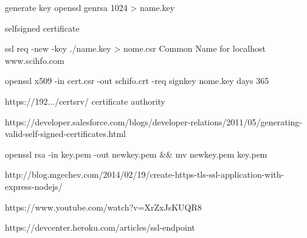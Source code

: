generate key
openssl genrsa 1024 > name.key

selfsigned certificate

ssl req -new -key ./name.key > nome.csr
Common Name for localhost www.scihfo.com

openssl x509 -in cert.csr -out schifo.crt -req signkey nome.key days 365

https://192.../certsrv/
certificate authority

https://developer.salesforce.com/blogs/developer-relations/2011/05/generating-valid-self-signed-certificates.html

openssl rsa -in key.pem -out newkey.pem && mv newkey.pem key.pem

http://blog.mgechev.com/2014/02/19/create-https-tls-ssl-application-with-express-nodejs/

https://www.youtube.com/watch?v=XrZxJsKUQR8

https://devcenter.heroku.com/articles/ssl-endpoint